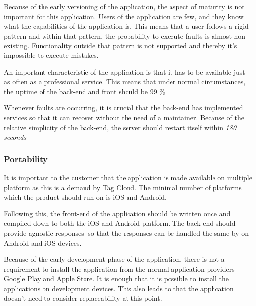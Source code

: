 Because of the early versioning of the application, the aspect of maturity is not important for this application. Users of the application are few, and they know what the capabilities of the application is. This means that a user follows a rigid pattern and within that pattern, the probability to execute faults is almost non-existing. Functionality outside that pattern is not supported and thereby it's impossible to execute mistakes.

An important characteristic of the application is that it has to be available just as often as a professional service. This means that under normal circumstances, the uptime of the back-end and front should be 99 \%

Whenever faults are occurring, it is crucial that the back-end has implemented services so that it can recover without the need of a maintainer. Because of the relative simplicity of the back-end, the server should restart itself within \textit{180 seconds}

\subsubsection{Portability}

It is important to the customer that the application is made available on multiple platform as this is a demand by Tag Cloud. The minimal number of platforms which the product should run on is iOS and Android. 

Following this, the front-end of the application should be written once and compiled down to both the iOS and Android platform. The back-end should provide agnostic responses, so that the responses can be handled the same by on Android and iOS devices. 

Because of the early development phase of the application, there is not a requirement to install the application from the normal application providers Google Play and Apple Store. It is enough that it is possible to install the applications on development devices. This also leads to that the application doesn't need to consider replaceability at this point.  



